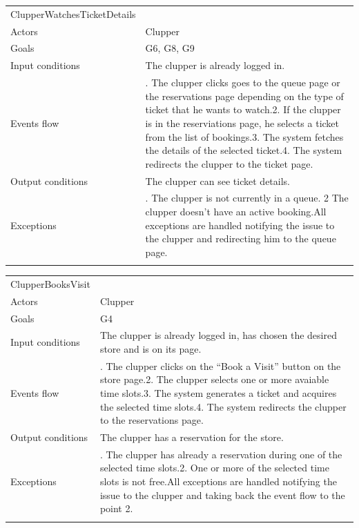 \begin{longtable}[]{@{}
  >{\raggedright\arraybackslash}p{}
  >{\raggedright\arraybackslash}p{}@{}}
\toprule
ClupperWatchesTicketDetails & \\ \addlinespace
\midrule
\endhead
Actors & Clupper \\ \addlinespace
Goals & G6, G8, G9 \\ \addlinespace
Input conditions & The clupper is already logged in. \\ \addlinespace
Events flow & 1. The clupper clicks goes to the queue page or the
reservations page depending on the type of ticket that he wants to
watch.2. If the clupper is in the reserviations page, he selects a
ticket from the list of bookings.3. The system fetches the details of
the selected ticket.4. The system redirects the clupper to the ticket
page. \\ \addlinespace
Output conditions & The clupper can see ticket details. \\ \addlinespace
Exceptions & 1. The clupper is not currently in a queue. 2 The clupper
doesn't have an active booking.All exceptions are handled notifying the
issue to the clupper and redirecting him to the queue
page. \\ \addlinespace
\bottomrule
\end{longtable}

\begin{longtable}[]{@{}
  >{\raggedright\arraybackslash}p{}
  >{\raggedright\arraybackslash}p{}@{}}
\toprule
ClupperBooksVisit & \\ \addlinespace
\midrule
\endhead
Actors & Clupper \\ \addlinespace
Goals & G4 \\ \addlinespace
Input conditions & The clupper is already logged in, has chosen the
desired store and is on its page. \\ \addlinespace
Events flow & 1. The clupper clicks on the ``Book a Visit'' button on
the store page.2. The clupper selects one or more avaiable time slots.3.
The system generates a ticket and acquires the selected time slots.4.
The system redirects the clupper to the reservations
page. \\ \addlinespace
Output conditions & The clupper has a reservation for the
store. \\ \addlinespace
Exceptions & 1. The clupper has already a reservation during one of the
selected time slots.2. One or more of the selected time slots is not
free.All exceptions are handled notifying the issue to the clupper and
taking back the event flow to the point 2. \\ \addlinespace
\bottomrule
\end{longtable}


